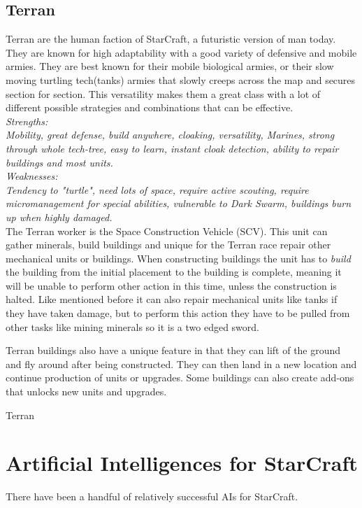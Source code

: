 \subsection{Terran}
Terran are the human faction of StarCraft, a futuristic version of man today. They are known for high adaptability with a good variety of defensive and mobile armies. They are best known for their mobile biological armies, or their slow moving turtling tech(tanks) armies that slowly creeps across the map and secures section for section. This versatility makes them a great class with a lot of different possible strategies and combinations that can be effective. 
\\
\textit{
Strengths: \\
Mobility, great defense, build anywhere, cloaking, versatility, Marines, strong through whole tech-tree, easy to learn, instant cloak detection, ability to repair buildings and most units. \\
Weaknesses: \\
Tendency to "turtle", need lots of space, require active scouting, require micromanagement for special abilities, vulnerable to Dark Swarm, buildings burn up when highly damaged. 
} 
\cite{terranoverview}
\\

The Terran worker is the Space Construction Vehicle (SCV). This unit can gather minerals, build buildings and unique for the Terran race repair other mechanical units or buildings. When constructing buildings the unit has to \textit{build} the building from the initial placement to the building is complete, meaning it will be unable to perform other action in this time, unless the construction is halted. Like mentioned before it can also repair mechanical units like tanks if they have taken damage, but to perform this action they have to be pulled from other tasks like mining minerals so it is a two edged sword. 

Terran buildings also have a unique feature in that they can lift of the ground and fly around after being constructed. They can then land in a new location and continue production of units or upgrades. Some buildings can also create add-ons that unlocks new units and upgrades. 

Terran 

\section{Artificial Intelligences for StarCraft}
There have been a handful of relatively successful AIs for StarCraft.

